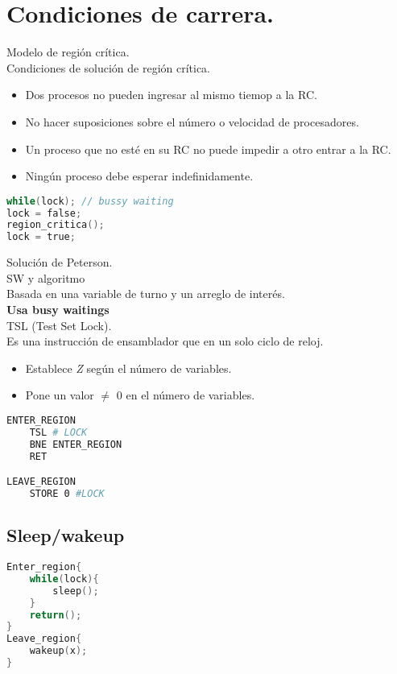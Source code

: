 \newpage
\chapter{Condiciones de carrera.}

Modelo de regi\'{o}n cr\'{i}tica.\\
Condiciones de soluci\'{o}n de regi\'{o}n cr\'{i}tica.\\

\begin{itemize}
	\item Dos procesos no pueden ingresar al mismo tiemop a la RC.
	\item No hacer suposiciones sobre el n\'{u}mero o velocidad de procesadores.
	\item Un proceso que no est\'{e} en su RC no puede impedir a otro entrar a la RC.
	\item Ning\'{u}n proceso debe esperar indefinidamente.
\end{itemize}
\begin{lstlisting}[language=C]
while(lock); // bussy waiting
lock = false;
region_critica();
lock = true;
\end{lstlisting}
Soluci\'{o}n de Peterson.\\
SW y algoritmo\\
Basada en una variable de turno y un arreglo de inter\'{e}s.\\
\textbf{Usa busy waitings}\\
\large{TSL (Test Set Lock)}.\\
Es una instrucci\'{o}n de ensamblador que en un solo ciclo de reloj.\\
\begin{itemize}
	\item Establece \textit{Z} seg\'{u}n el n\'{u}mero de variables.
	\item Pone un valor $\neq$ 0 en el n\'{u}mero de variables.
\end{itemize}

\begin{lstlisting}[language=bash ]
ENTER_REGION
	TSL # LOCK
	BNE ENTER_REGION
	RET

LEAVE_REGION
	STORE 0 #LOCK
\end{lstlisting}

\section{Sleep/wakeup}
\begin{lstlisting}[language=C]
Enter_region{
	while(lock){
		sleep();
	}
	return();
}
Leave_region{
	wakeup(x);
}
\end{lstlisting}


